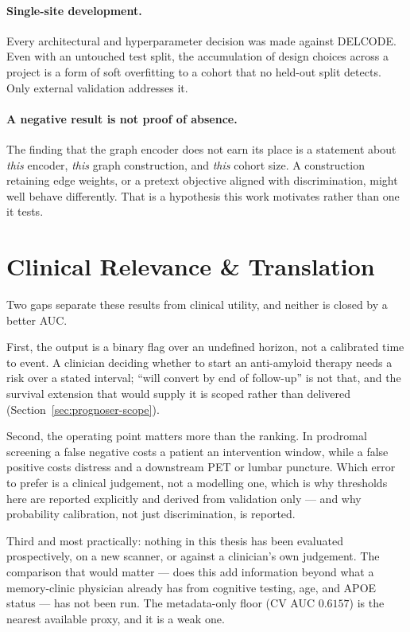 \paragraph{Single-site development.} Every architectural and hyperparameter decision was
made against DELCODE. Even with an untouched test split, the accumulation of design choices
across a project is a form of soft overfitting to a cohort that no held-out split detects.
Only external validation addresses it.

\paragraph{A negative result is not proof of absence.} The finding that the graph encoder
does not earn its place is a statement about \emph{this} encoder, \emph{this} graph
construction, and \emph{this} cohort size. A construction retaining edge weights, or a
pretext objective aligned with discrimination, might well behave differently. That is a
hypothesis this work motivates rather than one it tests.

\section{Clinical Relevance \& Translation}
\label{sec:disc-clinical}

Two gaps separate these results from clinical utility, and neither is closed by a better
AUC.

First, the output is a binary flag over an undefined horizon, not a calibrated time to
event. A clinician deciding whether to start an anti-amyloid therapy needs a risk over a
stated interval; ``will convert by end of follow-up'' is not that, and the survival
extension that would supply it is scoped rather than delivered
(Section~\ref{sec:prognoser-scope}).

Second, the operating point matters more than the ranking. In prodromal screening a false
negative costs a patient an intervention window, while a false positive costs distress and
a downstream PET or lumbar puncture. Which error to prefer is a clinical judgement, not a
modelling one, which is why thresholds here are reported explicitly and derived from
validation only --- and why probability calibration, not just discrimination, is reported.

Third and most practically: nothing in this thesis has been evaluated prospectively, on a
new scanner, or against a clinician's own judgement. The comparison that would matter ---
does this add information beyond what a memory-clinic physician already has from cognitive
testing, age, and APOE status --- has not been run. The metadata-only floor
(CV AUC $0.6157$) is the nearest available proxy, and it is a weak one.
